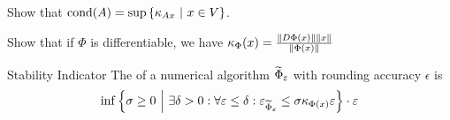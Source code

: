 \begin{exercise}
	Show that $\operatorname{cond}(A) = \sup \qty{\kappa_{Ax} ~\middle|~x \in V}$.
\end{exercise}
\begin{exercise}
	Show that if $\Phi$ is differentiable, we have $\kappa_{\Phi}(x) = \frac{\norm{D\Phi(x)}\norm{x}}{\norm{\Phi(x)}}$
\end{exercise}
\begin{importantdefinition}{Stability Indicator}{}
	The  of a numerical algorithm $\widetilde \Phi_\varepsilon$ with rounding accuracy $\epsilon$ is
	\begin{align*}
		\inf \lr{\sigma \geq 0 \mid \exists \delta > 0 : \forall \epsilon \leq \delta : \epsilon_{\tPhi_\epsilon} \leq \sigma \kappa_{\Phi(x)}\epsilon} \cdot \epsilon
	\end{align*}
\end{importantdefinition}
